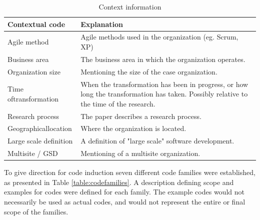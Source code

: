 \documentclass[preprint,authoryear,12pt]{elsarticle}
\begin{document}
\begin{table}[h]
    \begin{tabular}{ p{} p{} }
        \toprule
        Contextual code     & Explanation   \\
        \midrule

Agile method & Agile methods used in the organization (eg. Scrum, XP) \\

Business area & The business area in which the organization operates. \\

Organization size & Mentioning the size of the case organization. \\

Time of\newline transformation & When the transformation has been in
progress, or how long the transformation has taken. Possibly relative to
the time of the research. \\

Research process & The paper describes a research process. \\

Geographical\newline location & Where the organization is located. \\

Large scale definition & A definition of "large scale" software development. \\

Multisite / GSD & Mentioning of a multisite organization. \\

        \bottomrule
    \end{tabular}
    \caption{Context information}
    \label{table:contextualcodes}
\end{table}

To give direction for code induction seven different code families were
established, as presented in Table \ref{table:codefamilies}. A description
defining scope and examples for codes were defined for each family. The example
codes would not necessarily be used as actual codes, and would not represent the
entire or final scope of the families.
\end{document}

